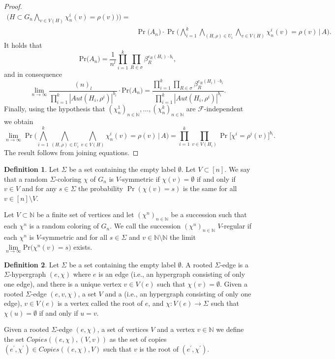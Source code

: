 \documentclass[12pt,notitlepage,a4paper]{article}
\theoremstyle{definition}
\newtheorem{definition}{Definition}[section]
\newcommand{\N}{\mathbb{N}}
\newcommand{\Ln}{\lim\limits_{n\to \infty}}
\newcommand{\PR}[1]{\mathrm{Pr}\big(#1\big)}
\begin{document}
\begin{proof}
\begin{align*}
	\big(H\subset G_n \bigwedge_{v\in V(H)} \chi_n^i(v)=\rho(v) \big) \Big)=\\
	&\Pr\big(A_n\big)\cdot \Pr\big(\bigwedge_{i=1}^k \bigwedge_{(H,\rho)\in U_i} 
	\bigwedge_{v\in V(H)} \chi^i_n(v)=\rho(v) \, \big| \, A \big).
	\end{align*}
	It holds that
	\[
	\PR{A_n}=\frac{1}{n^l} \prod_{i=1}^{k}\prod_{R\in \sigma} \beta_R^{e_R(H_i)\cdot b_i},
	\]
	and in consequence 
	\[
	\Ln \frac{(n)_l}{\prod_{i=1}^k |Aut(H_i,\rho^i)|^{b_i}}\cdot \PR{A_n}
	= \frac{\prod_{i=1}^{k}\prod_{R\in \sigma} \beta_R^{e_R(H_i)\cdot b_i}}
	{\prod_{i=1}^k |Aut(H_i,\rho^i)|^{b_i}}.
	\]
	Finally, using the hypothesis that 
	$(\chi^1_n)_{n\in\N}, \dots, (\chi^k_n)_{n\in\N}$
	are $\mathcal{F}$-independent we obtain
	\[
	\Ln \Pr\big(\bigwedge_{i=1}^k \bigwedge_{(H,\rho)\in U_i} 
	\bigwedge_{v\in V(H)} \chi^i_n(v)=\rho(v) \, \big| \, A \big)
	= \prod_{i=1}^{k} \prod_{v\in V(H_i)} \Pr\big[ \chi^i=\rho^i(v)\big]^{b_i}.
	\]
	The result follows from joining equations. 
\end{proof}

\begin{definition}
	Let $\Sigma$ be a set containing the empty label $\emptyset$.
	Let $V\subset [n]$. We say that a random $\Sigma$-coloring $\chi$
	of $G_n$ is $V$-symmetric if $\chi(v)=\emptyset$ if and only if $v\in V$ and
	for any $s\in \Sigma$ the probability $\Pr(\chi(v)=s)$ is the same for all 
	$v\in [n]\setminus V$. \par
	Let $V\subset \N$ be a finite set of vertices and let $(\chi^n)_{n\in \N}$
	be a succession such that each $\chi^n$ is a random coloring of $G_n$. We
	call the succession $(\chi^n)_{n\in \N}$ $V$-regular if each $\chi^n$ is
	$V$-symmetric and for all $s\in \Sigma$ and $v\in \N \setminus \N$ the limit 
	$\Ln \PR{\chi^n(v)=s}$ exists. 
\end{definition}

\begin{definition}
	Let $\Sigma$ be a set containing the empty label $\emptyset$. A rooted $\Sigma$-edge
	is a $\Sigma$-hypergraph $(e,\chi)$ where $e$ is an edge 
	(i.e., an hypergraph consisting of only one edge), and there is a unique vertex
	$v\in V(e)$ such that $\chi(v)=\emptyset$.
	Given a rooted $\Sigma$-edge $(e,v,\chi)$, a set $V$ and a 
	(i.e., an hypergraph consisting of only one edge), $v\in V(e)$ is a vertex called the root 
	of $e$, and $\chi: V(e)\rightarrow \Sigma$ such that $\chi(u)=\emptyset$ if and only if 
	$u=v$.\par
	Given a rooted $\Sigma$-edge $(e,\chi)$, a set of vertices $V$ and a vertex $v\in \N$
	we define the set $Copies((e,\chi),(V,v))$ as the set of copies 
	$(e^\prime, \chi^\prime) \in  Copies((e,\chi),V)$ such that $v$ is
	 the root of $(e^\prime,\chi^\prime)$.
\end{definition}
\end{document}
